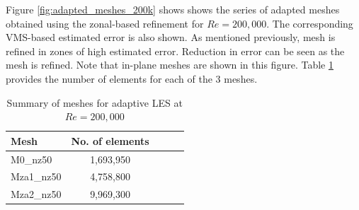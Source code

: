 
Figure \ref{fig:adapted_meshes_200k} shows 
shows the series of adapted meshes obtained using the zonal-based refinement for $Re=200,000$. The corresponding VMS-based estimated error is also shown. As mentioned previously, mesh is refined in zones of high estimated error. 
Reduction in error can be seen as the mesh is refined.
Note that in-plane meshes are shown in this figure.
Table \ref{table:adapt_mesh_details_Re200k} provides the number of elements for each of the 3 meshes.

\begin{table}[H]
	\centering
	\caption{Summary of meshes for adaptive LES at $Re=200,000$}
	\label{table:adapt_mesh_details_Re200k}
	\begin{tabular}{|l|c|c|c|c|}
		\hline
		Mesh   & No. of elements \\
		\hline
		M0\_nz50	& 1,693,950 \\
		\hline
		Mza1\_nz50	& 4,758,800 \\
		\hline		
		Mza2\_nz50  &  9,969,300 \\
		\hline
	\end{tabular}
\end{table}


